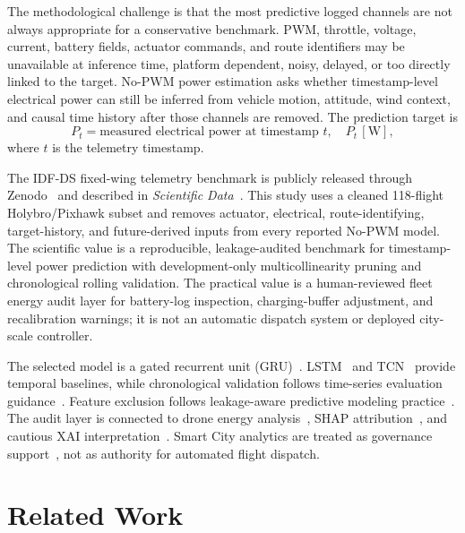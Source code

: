 \documentclass[runningheads,a4paper]{llncs}
\begin{document}
The methodological challenge is that the most predictive logged channels are not always appropriate for a conservative benchmark. PWM, throttle, voltage, current, battery fields, actuator commands, and route identifiers may be unavailable at inference time, platform dependent, noisy, delayed, or too directly linked to the target. No-PWM power estimation asks whether timestamp-level electrical power can still be inferred from vehicle motion, attitude, wind context, and causal time history after those channels are removed. The prediction target is
\begin{equation}
  P_t = \text{measured electrical power at timestamp }t,\quad P_t\,[\mathrm{W}],
  \label{eq:target}
\end{equation}
where $t$ is the telemetry timestamp.

The IDF-DS fixed-wing telemetry benchmark is publicly released through Zenodo~\cite{garcia2025zenodo} and described in \textit{Scientific Data}~\cite{garcia2026idfds}. This study uses a cleaned 118-flight Holybro/Pixhawk subset and removes actuator, electrical, route-identifying, target-history, and future-derived inputs from every reported No-PWM model. The scientific value is a reproducible, leakage-audited benchmark for timestamp-level power prediction with development-only multicollinearity pruning and chronological rolling validation. The practical value is a human-reviewed fleet energy audit layer for battery-log inspection, charging-buffer adjustment, and recalibration warnings; it is not an automatic dispatch system or deployed city-scale controller.

The selected model is a gated recurrent unit (GRU)~\cite{cho2014gru}. LSTM~\cite{hochreiter1997lstm} and TCN~\cite{bai2018tcn} provide temporal baselines, while chronological validation follows time-series evaluation guidance~\cite{bergmeir2018cv}. Feature exclusion follows leakage-aware predictive modeling practice~\cite{kaufman2012leakage}. The audit layer is connected to drone energy analysis~\cite{stolaroff2018drone}, SHAP attribution~\cite{lundberg2017shap}, and cautious XAI interpretation~\cite{arrieta2020xai}. Smart City analytics are treated as governance support~\cite{batty2012smart}, not as authority for automated flight dispatch.

\section{Related Work}
\end{document}
